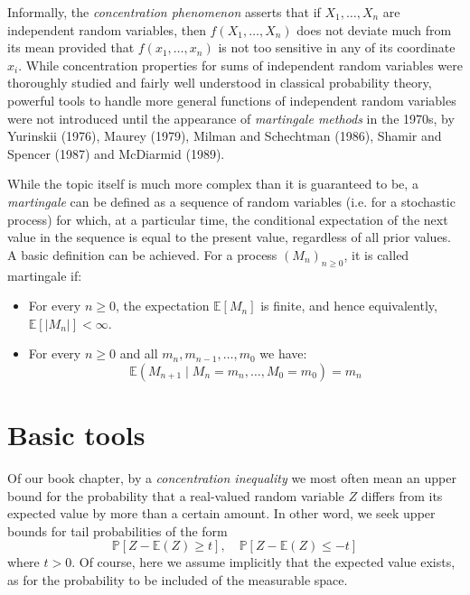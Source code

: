 Informally, the \textit{concentration phenomenon} asserts that if $X_{1},\dots,X_{n}$ are independent random variables, then $f(X_{1},\dots,X_{n})$ does not deviate much from its mean provided that $f(x_{1},\dots,x_{n})$ is not too sensitive in any of its coordinate $x_{i}$. While concentration properties for sums of independent random variables were thoroughly studied and fairly well understood in classical probability theory, powerful tools to handle more general functions of independent random variables were not introduced until the appearance of \textit{martingale methods} in the 1970s, by Yurinskii (1976), Maurey (1979), Milman and Schechtman (1986), Shamir and Spencer (1987) and McDiarmid (1989). 
\begin{note}
    While the topic itself is much more complex than it is guaranteed to be, a \textit{martingale} can be defined as a sequence of random variables (i.e. for a stochastic process) for which, at a particular time, the conditional expectation of the next value in the sequence is equal to the present value, regardless of all prior values. A basic definition can be achieved. For a process $(M_n)_{n\geq 0}$, it is called martingale if:
    \begin{itemize}[noitemsep,topsep=1pt]
        \item For every $n\geq 0$, the expectation $\mathbb{E}[M_n]$ is finite, and hence equivalently, $\mathbb{E}[\lvert M_n \rvert]< \infty$.
        \item For every $n\geq 0$ and all $m_{n},m_{n-1},\dots,m_{0}$ we have: \begin{equation}
            \mathbb{E}(M_{n+1}\mid M_n = m_{n},\dots, M_{0}=m_{0}) = m_{n}
        \end{equation}
    \end{itemize} 
\end{note}

\section{Basic tools}
Of our book chapter, by a \textit{concentration inequality} we most often mean an upper bound for the probability that a real-valued random variable $Z$ differs from its expected value by more than a certain amount. In other word, we seek upper bounds for tail probabilities of the form 
\begin{equation}
    \mathbb{P}[Z-\mathbb{E}(Z)\geq t], \quad \mathbb{P}[Z-\mathbb{E}(Z)\leq -t] 
\end{equation}
where $t>0$. Of course, here we assume implicitly that the expected value exists, as for the probability to be included of the measurable space. 

